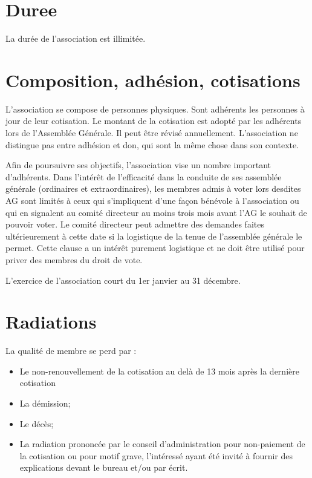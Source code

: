 \documentclass[11 pt]{article}
\begin{document}
\section{Duree}

La durée de l’association est illimitée.

\section{Composition, adhésion, cotisations}

L'association se compose de personnes physiques. Sont adhérents les
personnes à jour de leur cotisation.  Le montant de la cotisation est
adopté par les adhérents lors de l'Assemblée Générale. Il peut être
révisé annuellement.  L'association ne distingue pas entre adhésion et
don, qui sont la même chose dans son contexte.

Afin de poursuivre ses objectifs, l'association vise un nombre
important d'adhérents.  Dans l'intérêt de l'efficacité dans la conduite
de ses assemblée générale (ordinaires et extraordinaires), les membres
admis à voter lors desdites AG sont limités à ceux qui s'impliquent
d'une façon bénévole à l'association ou qui en signalent au comité
directeur au moins trois mois avant l’AG le souhait de pouvoir voter.
Le comité directeur peut admettre des demandes faites ultérieurement à
cette date si la logistique de la tenue de l’assemblée générale le
permet.  Cette clause a un intérêt purement logistique et ne doit être
utilisé pour priver des membres du droit de vote.

L'exercice de l'association court du 1er janvier au 31 décembre.

\section{Radiations}

La qualité de membre se perd par :
\begin{itemize}
\item Le non-renouvellement de la cotisation au delà de 13 mois après la dernière cotisation
\item La démission;
\item Le décès;
\item La radiation prononcée par le conseil d'administration pour
  non-paiement de la cotisation ou pour motif grave, l'intéressé ayant
  été invité à fournir des explications devant le bureau et/ou par
  écrit.
\end{itemize}
\end{document}
